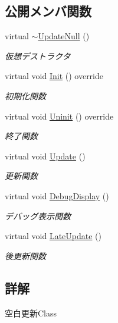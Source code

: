 \subsection*{公開メンバ関数}
\begin{DoxyCompactItemize}
\item 
virtual \mbox{\hyperlink{class_update_null_a917cb158fb0993b736c59ed8300e7a77}{$\sim$\+Update\+Null}} ()
\begin{DoxyCompactList}\small\item\em 仮想デストラクタ \end{DoxyCompactList}\item 
virtual void \mbox{\hyperlink{class_update_null_aaa8f5fe1f03e252ad75eb8c888a5bf46}{Init}} () override
\begin{DoxyCompactList}\small\item\em 初期化関数 \end{DoxyCompactList}\item 
virtual void \mbox{\hyperlink{class_update_null_a820189d686ec62f7a30d547118c419df}{Uninit}} () override
\begin{DoxyCompactList}\small\item\em 終了関数 \end{DoxyCompactList}\item 
virtual void \mbox{\hyperlink{class_update_null_ab3f9cabc6ddcb4ef8743f212c26be144}{Update}} ()
\begin{DoxyCompactList}\small\item\em 更新関数 \end{DoxyCompactList}\item 
virtual void \mbox{\hyperlink{class_update_null_a98c7241e5ef276510830eb6df9ed0fbb}{Debug\+Display}} ()
\begin{DoxyCompactList}\small\item\em デバッグ表示関数 \end{DoxyCompactList}\item 
virtual void \mbox{\hyperlink{class_update_null_a8d335882bce4eab384d44c4bae474ee5}{Late\+Update}} ()
\begin{DoxyCompactList}\small\item\em 後更新関数 \end{DoxyCompactList}\end{DoxyCompactItemize}


\subsection{詳解}
空白更新\+Class 

